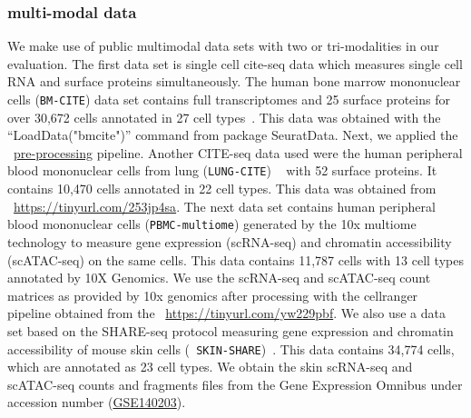 \subsubsection{multi-modal data} We make use of public multimodal data sets with two or tri-modalities in our evaluation.  The first data set is single cell cite-seq data which measures single cell RNA and surface proteins simultaneously. The human bone marrow mononuclear cells ({\texttt{BM-CITE}}) data set contains full transcriptomes and 25 surface proteins for over 30,672 cells annotated in 27 cell types~\cite{stuart2020multimodal}. This data was obtained with the ``LoadData("bmcite")'' command from package SeuratData. Next, we applied the ~\hyperref[sec:preproccessing]{pre-processing} pipeline. Another CITE-seq data used were the human peripheral blood mononuclear cells from lung ({\texttt{LUNG-CITE}}) ~\cite{buus2021improving} with 52 surface proteins. It contains 10,470 cells annotated in 22 cell types. This data was obtained from ~\url{https://tinyurl.com/253jp4sa}. The next data set contains human peripheral blood mononuclear cells ({\texttt{PBMC-multiome}}) generated by the 10x multiome technology to measure gene expression (scRNA-seq) and chromatin accessibility (scATAC-seq) on the same cells. This data contains 11,787 cells with 13 cell types annotated by 10X Genomics.  We use the scRNA-seq and scATAC-seq count matrices as provided by 10x genomics after processing with the cellranger pipeline obtained from the 
~\url{https://tinyurl.com/yw229pbf}. We also use a data set based on the SHARE-seq protocol measuring gene expression and chromatin accessibility of mouse skin cells ({\texttt{ SKIN-SHARE}})~\cite{ma2020chromatin}. This data contains 34,774 cells, which are annotated as 23 cell types. We obtain the skin scRNA-seq and scATAC-seq counts and fragments files from the Gene Expression Omnibus under accession number (\href{https://www.ncbi.nlm.nih.gov/geo/query/acc.cgi?acc=GSE140203}{GSE140203}).
